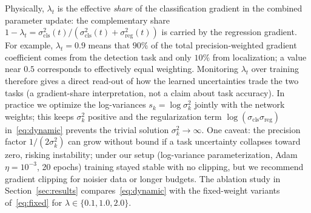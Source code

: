 \documentclass[sensors,article,submit,pdftex,moreauthors]{Definitions/mdpi}
\begin{document}
Physically, $\lambda_t$ is the effective \emph{share} of the classification gradient in the combined parameter update: the complementary share $1-\lambda_t=\sigma_{\mathrm{cls}}^{2}(t)/(\sigma_{\mathrm{cls}}^{2}(t)+\sigma_{\mathrm{reg}}^{2}(t))$ is carried by the regression gradient. For example, $\lambda_t=0.9$ means that $90\%$ of the total precision-weighted gradient coefficient comes from the detection task and only $10\%$ from localization; a value near $0.5$ corresponds to effectively equal weighting. Monitoring $\lambda_t$ over training therefore gives a direct read-out of how the learned uncertainties trade the two tasks (a gradient-share interpretation, not a claim about task accuracy). In practice we optimize the log-variances $s_k=\log\sigma_k^{2}$ jointly with the network weights; this keeps $\sigma_k^{2}$ positive and the regularization term $\log(\sigma_{\mathrm{cls}}\sigma_{\mathrm{reg}})$ in~\eqref{eq:dynamic} prevents the trivial solution $\sigma_k^{2}\!\to\!\infty$. One caveat: the precision factor $1/(2\sigma_k^{2})$ can grow without bound if a task uncertainty collapses toward zero, risking instability; under our setup (log-variance parameterization, Adam $\eta=10^{-3}$, 20 epochs) training stayed stable with no clipping, but we recommend gradient clipping for noisier data or longer budgets. The ablation study in Section~\ref{sec:results} compares~\eqref{eq:dynamic} with the fixed-weight variants of~\eqref{eq:fixed} for $\lambda\in\{0.1,1.0,2.0\}$.
\end{document}
